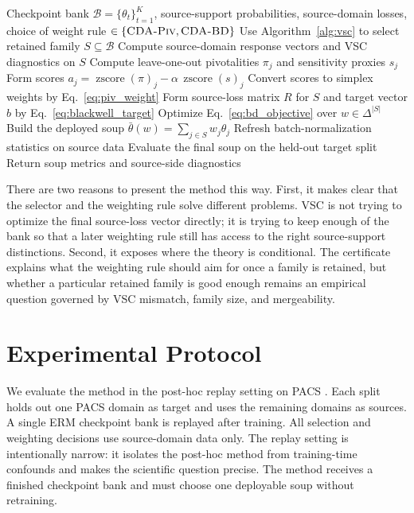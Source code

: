 \documentclass{article}
\theoremstyle{definition}
\newcommand{\cB}{\mathcal{B}}
\newcommand{\simplex}{\Delta}
\newcommand{\piv}{\textup{\textsc{CDA-Piv}}}
\newcommand{\bd}{\textup{\textsc{CDA-BD}}}
\newcommand{\thetaw}{\bar{\theta}(w)}
\begin{document}
\begin{algorithm}[t]
\caption{Practical CDA pipeline}
\label{alg:cda_pipeline}
\begin{algorithmic}[1]
\Require Checkpoint bank \(\cB=\{\theta_t\}_{t=1}^K\), source-support probabilities, source-domain losses, choice of weight rule \(\in\{\piv{},\bd{}\}\)
\State Use Algorithm~\ref{alg:vsc} to select retained family \(S\subseteq\cB\)
\State Compute source-domain response vectors and VSC diagnostics on \(S\)
\If{weight rule = \piv{}}
    \State Compute leave-one-out pivotalities \(\pi_j\) and sensitivity proxies \(s_j\)
    \State Form scores \(a_j=\operatorname{zscore}(\pi)_j-\alpha\,\operatorname{zscore}(s)_j\)
    \State Convert scores to simplex weights by Eq.~\eqref{eq:piv_weight}
\Else
    \State Form source-loss matrix \(R\) for \(S\) and target vector \(b\) by Eq.~\eqref{eq:blackwell_target}
    \State Optimize Eq.~\eqref{eq:bd_objective} over \(w\in\simplex^{|S|}\)
\EndIf
\State Build the deployed soup \(\thetaw=\sum_{j\in S}w_j\theta_j\)
\State Refresh batch-normalization statistics on source data
\State Evaluate the final soup on the held-out target split
\State Return soup metrics and source-side diagnostics
\end{algorithmic}
\end{algorithm}

There are two reasons to present the method this way. First, it makes clear that the selector and the weighting rule solve different problems. VSC is not trying to optimize the final source-loss vector directly; it is trying to keep enough of the bank so that a later weighting rule still has access to the right source-support distinctions. Second, it exposes where the theory is conditional. The certificate explains what the weighting rule should aim for once a family is retained, but whether a particular retained family is good enough remains an empirical question governed by VSC mismatch, family size, and mergeability.

\section{Experimental Protocol}
\label{sec:experiments}

We evaluate the method in the post-hoc replay setting on PACS \citep{li2017deeper}. Each split holds out one PACS domain as target and uses the remaining domains as sources. A single ERM checkpoint bank is replayed after training. All selection and weighting decisions use source-domain data only. The replay setting is intentionally narrow: it isolates the post-hoc method from training-time confounds and makes the scientific question precise. The method receives a finished checkpoint bank and must choose one deployable soup without retraining.
\end{document}
